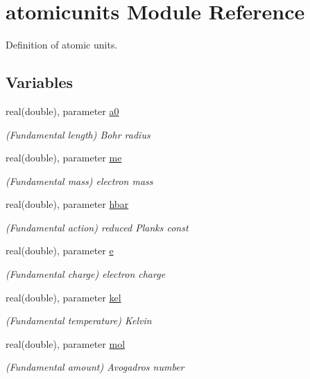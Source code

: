 \hypertarget{namespaceatomicunits}{}\section{atomicunits Module Reference}
\label{namespaceatomicunits}


Definition of atomic units.  


\subsection*{Variables}
\begin{DoxyCompactItemize}
\item 
real(double), parameter \hyperlink{namespaceatomicunits_aa4859dbb9e7739ae603b78d9f2c58f93}{a0}
\begin{DoxyCompactList}\small\item\em (Fundamental length) Bohr radius \end{DoxyCompactList}\item 
real(double), parameter \hyperlink{namespaceatomicunits_a02f36d49c4a56d1cc84c8cda6c631a68}{me}
\begin{DoxyCompactList}\small\item\em (Fundamental mass) electron mass \end{DoxyCompactList}\item 
real(double), parameter \hyperlink{namespaceatomicunits_a7dffaade5d28d129a3726e8eff794447}{hbar}
\begin{DoxyCompactList}\small\item\em (Fundamental action) reduced Planks const \end{DoxyCompactList}\item 
real(double), parameter \hyperlink{namespaceatomicunits_af3650eaf423c8af5e887256a5e8023d6}{e}
\begin{DoxyCompactList}\small\item\em (Fundamental charge) electron charge \end{DoxyCompactList}\item 
real(double), parameter \hyperlink{namespaceatomicunits_a0b4d6ac453558bc86022587236f7d076}{kel}
\begin{DoxyCompactList}\small\item\em (Fundamental temperature) Kelvin \end{DoxyCompactList}\item 
real(double), parameter \hyperlink{namespaceatomicunits_af00d60f8fc301784d6e48a53e524a4c8}{mol}
\begin{DoxyCompactList}\small\item\em (Fundamental amount) Avogadro\textquotesingle{}s number \end{DoxyCompactList}\item 

\end{DoxyCompactItemize}
